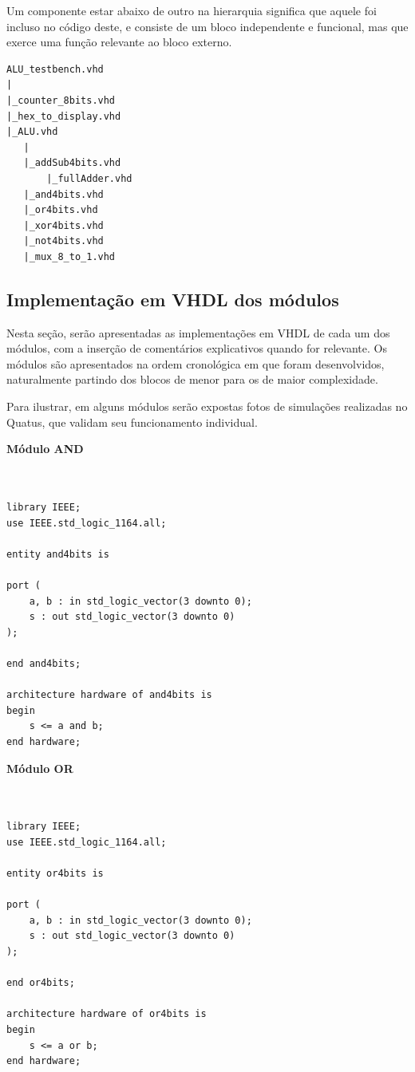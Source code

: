 \documentclass{article}
\begin{document}
Um componente estar abaixo de outro na hierarquia significa que aquele foi
incluso no código deste, e consiste de um bloco independente e funcional, mas
que exerce uma função relevante ao bloco externo.

\begin{verbatim}
ALU_testbench.vhd
|
|_counter_8bits.vhd
|_hex_to_display.vhd
|_ALU.vhd
   |
   |_addSub4bits.vhd
       |_fullAdder.vhd
   |_and4bits.vhd
   |_or4bits.vhd
   |_xor4bits.vhd
   |_not4bits.vhd
   |_mux_8_to_1.vhd

\end{verbatim}

\subsection{Implementação em VHDL dos módulos}

Nesta seção, serão apresentadas as implementações em VHDL de cada um dos módulos,
com a inserção de comentários explicativos quando for relevante. Os módulos são
apresentados na ordem cronológica em que foram desenvolvidos, naturalmente partindo
dos blocos de menor para os de maior complexidade.

Para ilustrar, em alguns módulos serão expostas fotos de simulações realizadas no
Quatus, que validam seu funcionamento individual.
\newline

\textbf{Módulo AND}

\begin{verbatim}


library IEEE;
use IEEE.std_logic_1164.all;

entity and4bits is

port (
	a, b : in std_logic_vector(3 downto 0);
	s : out std_logic_vector(3 downto 0)
);

end and4bits;

architecture hardware of and4bits is
begin
	s <= a and b;
end hardware;

\end{verbatim}

\textbf{Módulo OR}

\begin{verbatim}


library IEEE;
use IEEE.std_logic_1164.all;

entity or4bits is

port (
	a, b : in std_logic_vector(3 downto 0);
	s : out std_logic_vector(3 downto 0)
);

end or4bits;

architecture hardware of or4bits is
begin
	s <= a or b;
end hardware;

\end{verbatim}
\end{document}
